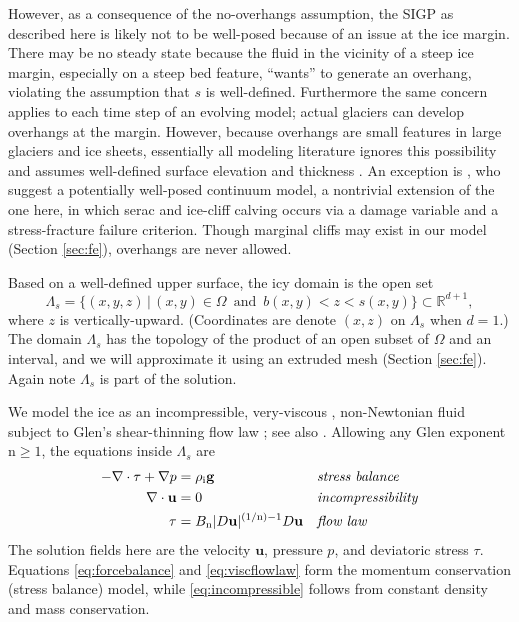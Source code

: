 \documentclass[letterpaper,final,12pt,reqno]{amsart}
\theoremstyle{claim}
\newcommand{\RR}{\mathbb{R}}
\newcommand{\bg}{\mathbf{g}}
\newcommand{\bu}{\mathbf{u}}
\newcommand{\rhoi}{\rho_{\text{i}}}
\newcommand{\nn}{{\text{n}}}
\numberwithin{equation}{section}
\numberwithin{figure}{section}
\numberwithin{table}{section}
\numberwithin{theorem}{section}
\begin{document}
However, as a consequence of the no-overhangs assumption, the SIGP as described here is likely not to be well-posed because of an issue at the ice margin.  There may be no steady state because the fluid in the vicinity of a steep ice margin, especially on a steep bed feature, ``wants'' to generate an overhang, violating the assumption that $s$ is well-defined.  Furthermore the same concern applies to each time step of an evolving model; actual glaciers can develop overhangs at the margin.  However, because overhangs are small features in large glaciers and ice sheets, essentially all modeling literature ignores this possibility and assumes well-defined surface elevation and thickness \cite{Jouvetetal2008,Lengetal2012,WirbelJarosch2020}.  An exception is \cite{PralongFunk2005}, who suggest a potentially well-posed continuum model, a nontrivial extension of the one here, in which serac and ice-cliff calving occurs via a damage variable and a stress-fracture failure criterion.  Though marginal cliffs may exist in our model (Section \ref{sec:fe}), overhangs are never allowed.

Based on a well-defined upper surface, the icy domain is the open set
\begin{equation}
\Lambda_s = \{(x,y,z)\,|\,(x,y) \in \Omega \,\text{ and }\, b(x,y) < z < s(x,y)\}  \subset \RR^{d+1}, \label{eq:lambdas}
\end{equation}
where $z$ is vertically-upward.  (Coordinates are denote $(x,z)$ on $\Lambda_s$ when $d=1$.)  The domain $\Lambda_s$ has the topology of the product of an open subset of $\Omega$ and an interval, and we will approximate it using an extruded mesh (Section \ref{sec:fe}).  Again note $\Lambda_s$ is part of the solution.

We model the ice as an incompressible, very-viscous \cite{Acheson1990}, non-Newtonian fluid subject to Glen's shear-thinning flow law \cite{GreveBlatter2009}; see also \cite[Chapter 1]{FowlerNg2021}.  Allowing any Glen exponent $\nn\ge 1$, the equations inside $\Lambda_s$ are
\begin{align}
- \nabla \cdot \tau + \nabla p &= \rhoi \bg &&\text{\emph{stress balance}} \label{eq:forcebalance} \\
\nabla \cdot \bu &= 0 &&\text{\emph{incompressibility}} \label{eq:incompressible} \\
\tau &= B_\nn |D\bu|^{(1/\nn) - 1} D\bu  &&\text{\emph{flow law}} \label{eq:viscflowlaw}
\end{align}
The solution fields here are the velocity $\bu$, pressure $p$, and deviatoric stress $\tau$.  Equations \eqref{eq:forcebalance} and \eqref{eq:viscflowlaw} form the momentum conservation (stress balance) model, while \eqref{eq:incompressible} follows from constant density and mass conservation.
\end{document}
